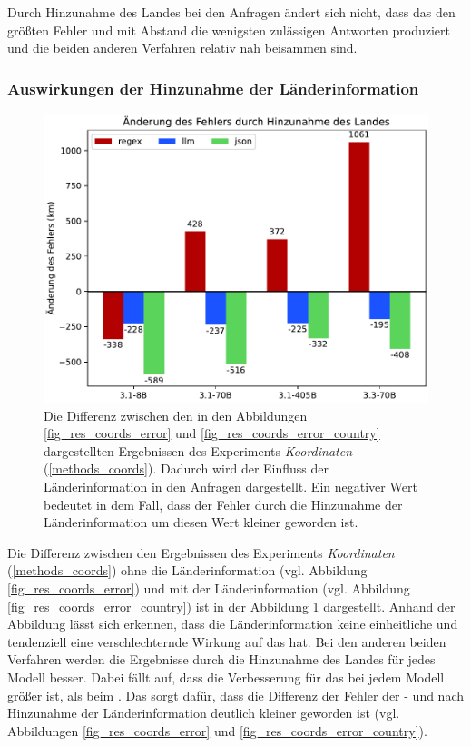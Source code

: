 Durch Hinzunahme des Landes bei den Anfragen ändert sich nicht, dass das \regexv{} den größten Fehler und mit Abstand die wenigsten zulässigen Antworten produziert und die beiden anderen Verfahren relativ nah beisammen sind.

\subsubsection*{Auswirkungen der Hinzunahme der Länderinformation}

\begin{figure}[tb] %
    \centering
    \includegraphics[width=0.7\columnwidth]{img/country_vs_no_country.pdf}
    \caption{Die Differenz zwischen den in den Abbildungen \ref{fig_res_coords_error} und \ref{fig_res_coords_error_country} dargestellten Ergebnissen des Experiments \textit{Koordinaten} (\ref{methods_coords}). Dadurch wird der Einfluss der Länderinformation in den Anfragen dargestellt. Ein negativer Wert bedeutet in dem Fall, dass der Fehler durch die Hinzunahme der Länderinformation um diesen Wert kleiner geworden ist.}
    \label{fig_res_coords_country}
\end{figure}


Die Differenz zwischen den Ergebnissen des Experiments \textit{Koordinaten} (\ref{methods_coords}) ohne die Länderinformation (vgl. Abbildung \ref{fig_res_coords_error}) und mit der Länderinformation (vgl. Abbildung \ref{fig_res_coords_error_country}) ist in der Abbildung \ref{fig_res_coords_country} dargestellt.
Anhand der Abbildung lässt sich erkennen, dass die Länderinformation keine einheitliche und tendenziell eine verschlechternde Wirkung auf das \regexv{} hat.
Bei den anderen beiden Verfahren werden die Ergebnisse durch die Hinzunahme des Landes für jedes Modell besser.
Dabei fällt auf, dass die Verbesserung für das \jsonv{} bei jedem Modell größer ist, als beim \llmv{}.
Das sorgt dafür, dass die Differenz der Fehler der \json{}- und \llmv{} nach Hinzunahme der Länderinformation deutlich kleiner geworden ist (vgl. Abbildungen \ref{fig_res_coords_error} und \ref{fig_res_coords_error_country}).

